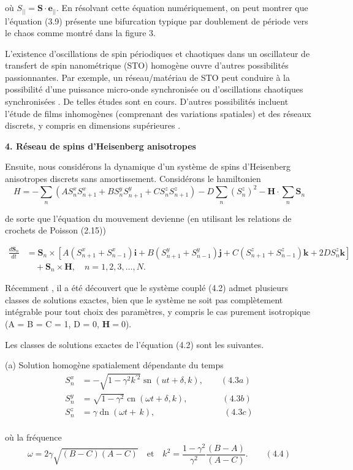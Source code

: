 \documentclass{article}
\begin{document}
   où \(S_{||} = \mathbf{S} \cdot \mathbf{e_{||}}\). En résolvant cette équation numériquement, on peut montrer que
   l'équation (3.9) présente une bifurcation typique par doublement de période vers le chaos comme
   montré dans la figure 3.
   
   L'existence d'oscillations de spin périodiques et chaotiques dans un oscillateur de transfert de spin nanométrique (STO) homogène ouvre d'autres possibilités passionnantes. Par exemple,
   un réseau/matériau de STO peut conduire à la possibilité d'une puissance micro-onde synchronisée
   ou d'oscillations chaotiques synchronisées \cite{ref13}. De telles études sont en cours.
   D'autres possibilités incluent l'étude de films inhomogènes (comprenant des variations spatiales)
   et des réseaux discrets, y compris en dimensions supérieures \cite{ref14}.\newline
   
   \textbf{4. Réseau de spins d'Heisenberg anisotropes}
   
   Ensuite, nous considérons la dynamique d'un système de spins d'Heisenberg anisotropes discrets sans amortissement. Considérons le hamiltonien
   \[
   H = -\sum_{n}(AS_{n}^{x}S_{n+1}^{x} + BS_{n}^{y}S_{n+1}^{y} + CS_{n}^{z}S_{n+1}^{z}) - D \sum_{n}(S_{n}^{z})^2 - \mathbf{H} \cdot \sum_{n}\mathbf{S}_n
   \]
   
   de sorte que l'équation du mouvement devienne (en utilisant les relations de crochets de Poisson (2.15))
   
   \begin{align*}
   \frac{d\mathbf{S}_n}{dt} &= \mathbf{S}_n \times \left[A(S_{n+1}^{x} +  S_{n-1}^{x})\mathbf{i} + B(S_{n+1}^{y} + S_{n-1}^{y})\mathbf{j} + C(S_{n+1}^{z} + 
   S_{n-1}^{z})\mathbf{k} + 2DS_{n}^{z}\mathbf{k}\right] \\
   &\quad + \mathbf{S}_n \times \mathbf{H}, \quad n = 1, 2, 3, \ldots, N.
   \end{align*}
   
   Récemment \cite{ref15,ref16}, il a été découvert que le système couplé (4.2) admet plusieurs classes de solutions exactes, bien que le système ne soit pas complètement intégrable pour tout choix des paramètres, y compris le cas purement isotropique (A = B = C = 1, D = 0, $\mathbf{H} = 0$).
   
   Les classes de solutions exactes de l'équation (4.2) sont les suivantes.
   
   (a) Solution homogène spatialement dépendante du temps
   \begin{align*}
   S_{n}^{x} &= -\sqrt{1 - \gamma^2k^{'2}}\operatorname{sn}(ut + \delta, k),\qquad (4.3a)\\
   S_{n}^{y} &= \sqrt{1 - \gamma^2}\operatorname{cn}(\omega t + \delta, k), \qquad \qquad (4.3b)\\
   S_{n}^{z} &= \gamma \operatorname{dn}(\omega t + \, k), \qquad \qquad \qquad \qquad (4.3c)
   \end{align*}\\
   o\`{u} la fréquence
   \[
   \omega = 2\gamma\sqrt{(B - C)(A - C)} \quad \text{et} \quad k^2 = \frac{ 1 - \gamma^2}{\gamma^{2}}\frac{(B - A)}{(A - C)}.  \qquad (4.4)
   \]
   
\end{document}
